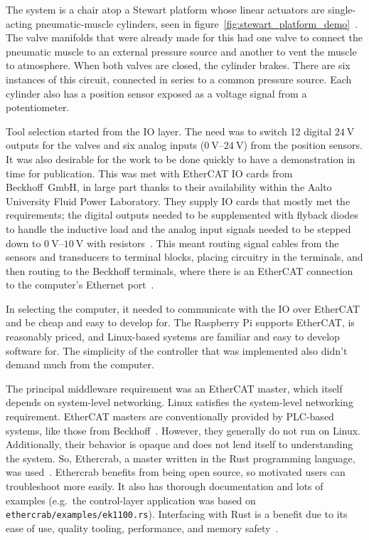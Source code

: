 \documentclass[english,12pt,a4paper,pdftex,eng,utf8]{aaltothesis}
\begin{document}
The system is a chair atop a Stewart platform whose linear actuators are single-acting pneumatic-muscle cylinders, seen in figure~\ref{fig:stewart_platform_demo}~\cite{Stewart1965, Caldwell1995}. The valve manifolds that were already made for this had one valve to connect the pneumatic muscle to an external pressure source and another to vent the muscle to atmosphere. When both valves are closed, the cylinder brakes. There are six instances of this circuit, connected in series to a common pressure source. Each cylinder also has a position sensor exposed as a voltage signal from a potentiometer.

Tool selection started from the IO layer. The need was to switch 12 digital $\qty{24}{\volt}$ outputs for the valves and six analog inputs ($\qtyrange[range-units=single,range-phrase=..]{0}{24}{\volt}$) from the position sensors. It was also desirable for the work to be done quickly to have a demonstration in time for publication. This was met with EtherCAT IO cards from Beckhoff~GmbH, in large part thanks to their availability within the Aalto University Fluid Power Laboratory. They supply IO cards that mostly met the requirements; the digital outputs needed to be supplemented with flyback diodes to handle the inductive load and the analog input signals needed to be stepped down to $\qtyrange[range-units=single,range-phrase=..]{0}{10}{\volt}$ with resistors~\cite{BeckhoffEL2042,BeckhoffEL3062}. This meant routing signal cables from the sensors and transducers to terminal blocks, placing circuitry in the terminals, and then routing to the Beckhoff terminals, where there is an EtherCAT connection to the computer's Ethernet port~\cite{BeckhoffEK1100}.

In selecting the computer, it needed to communicate with the IO over EtherCAT and be cheap and easy to develop for. The Raspberry Pi supports EtherCAT, is reasonably priced, and Linux-based systems are familiar and easy to develop software for.  The simplicity of the controller that was implemented also didn't demand much from the computer.

The principal middleware requirement was an EtherCAT master, which itself depends on system-level networking. Linux satisfies the system-level networking requirement. EtherCAT masters are conventionally provided by PLC-based systems, like those from Beckhoff~\cite{BeckhoffTwinCAT}. However, they generally do not run on Linux. Additionally, their behavior is opaque and does not lend itself to understanding the system. So, Ethercrab, a master written in the Rust programming language, was used~\cite{Ethercrab}. Ethercrab benefits from being open source, so motivated users can troubleshoot more easily. It also has thorough documentation and lots of examples (e.g.\ the control-layer application was based on \verb|ethercrab/examples/ek1100.rs|). Interfacing with Rust is a benefit due to its ease of use, quality tooling, performance, and memory safety~\cite{RustHomePage}.
\end{document}
